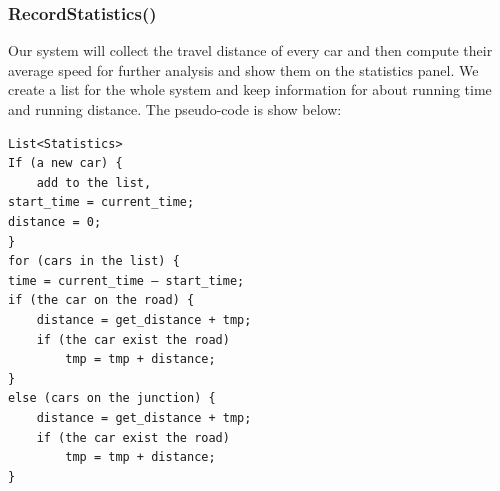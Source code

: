 \documentclass[a4paper,12pt]{article}
\begin{document}
\subsubsection{RecordStatistics()}
Our system will collect the travel distance of every car and then compute their average speed for further analysis and show them on the statistics panel. We create a list for the whole system and keep information for about running time and running distance. The pseudo-code is show below:
\begin{lstlisting}
List<Statistics>
If (a new car) {
    add to the list,
start_time = current_time;
distance = 0;
}
for (cars in the list) {
time = current_time – start_time;
if (the car on the road) {
    distance = get_distance + tmp;
    if (the car exist the road)
        tmp = tmp + distance;
}
else (cars on the junction) {
    distance = get_distance + tmp;
    if (the car exist the road)
        tmp = tmp + distance;
}
\end{lstlisting}
\end{document}
